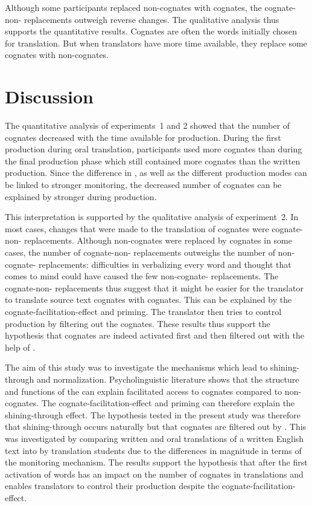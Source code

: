\documentclass[output=paper]{LSP/langsci}
\begin{document}
Although some participants replaced non-cognates with cognates, the cognate-non- replacements outweigh reverse changes. The qualitative analysis thus supports the quantitative results. Cognates are often the  words initially chosen for translation. But when translators have more time available, they replace some cognates with  non-cognates.

\section{Discussion}\label{oster:sec:4}
The quantitative analysis of experiments~1 and 2 showed that the number of cognates decreased with the time available for production. During the first production during oral translation, participants used more cognates than during the final production phase which still contained more cognates than the written production. Since the difference in  \citep{Ganushchak2006}, as well as the different production modes \citep{Treiman2003} can be linked to stronger monitoring, the decreased number of cognates can be explained by stronger  during  production. 

This interpretation is supported by the qualitative analysis of experiment~2. In most cases, changes that were made to the translation of cognates were cognate-non- replacements. Although non-cognates were replaced by cognates in some cases, the number of cognate-non- replacements outweighs the number of non-cognate- replacements: difficulties in verbalizing every word and thought that comes to mind could have caused the few non-cognate- replacements. The cognate-non- replacements thus suggest that it might be easier for the translator to translate source text cognates with  cognates. This can be explained by the cognate-facilitation-effect and priming. The translator then tries to control production by filtering out the cognates. These results thus support the hypothesis that cognates are indeed activated first and then filtered out with the help of .

The aim of this study was to investigate the mechanisms which lead to shining-through and normalization. Psycholinguistic literature shows that the structure and functions of the  can explain facilitated access to cognates compared to non-cognates. The cognate-facilitation-effect and priming can therefore explain the shining-through effect. The hypothesis tested in the present study was therefore that shining-through occurs naturally but that cognates are filtered out by . This was investigated by comparing written and oral translations of a written English text into  by translation students due to the differences in magnitude in terms of the monitoring mechanism. The results support the hypothesis that  after the first activation of words has an impact on the number of cognates in translations and enables translators to control their production despite the cognate-facilitation-effect. 
\end{document}
